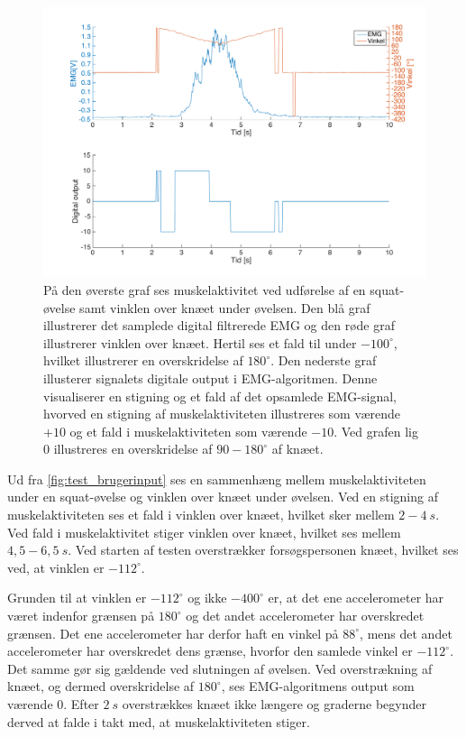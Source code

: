 \begin{figure}[H]
\centering
\includegraphics[width=1\textwidth]{figures/test_brugerinput}
\caption{På den øverste graf ses muskelaktivitet ved udførelse af en squat-øvelse samt vinklen over knæet under øvelsen. Den blå graf illustrerer det samplede digital filtrerede EMG og den røde graf illustrerer vinklen over knæet. Hertil ses et fald til under $-100^{\circ}$, hvilket illustrerer en overskridelse af $180^{\circ}$. Den nederste graf illusterer signalets digitale output i EMG-algoritmen. Denne visualiserer en stigning og et fald af det opsamlede EMG-signal, hvorved en stigning af muskelaktiviteten illustreres som værende $+10$ og et fald i muskelaktiviteten som værende $-10$. Ved grafen lig 0 illustreres en overskridelse af $90-180^{\circ}$ af knæet.}
\label{fig:test_brugerinput}
\end{figure}

\noindent
Ud fra \autoref{fig:test_brugerinput} ses en sammenhæng mellem muskelaktiviteten under en squat-øvelse og vinklen over knæet under øvelsen. Ved en stigning af muskelaktiviteten ses et fald i vinklen over knæet, hvilket sker mellem $2-4~s$. Ved fald i muskelaktivitet stiger vinklen over knæet, hvilket ses mellem $4,5-6,5~s$.
Ved starten af testen overstrækker forsøgspersonen knæet, hvilket ses ved, at vinklen er $-112^{\circ}$. 

Grunden til at vinklen er $-112^{\circ}$ og ikke $-400^{\circ}$ er, at det ene accelerometer har været indenfor grænsen på $180^{\circ}$ og det andet accelerometer har overskredet grænsen. Det ene accelerometer har derfor haft en vinkel på $88^{\circ}$, mens det andet accelerometer har overskredet dens grænse, hvorfor den samlede vinkel er $-112^{\circ}$. Det samme gør sig gældende ved slutningen af øvelsen. Ved overstrækning af knæet, og dermed overskridelse af $180^{\circ}$, ses EMG-algoritmens output som værende 0. 
Efter $2~s$ overstrækkes knæet ikke længere og graderne begynder derved at falde i takt med, at muskelaktiviteten stiger. 

